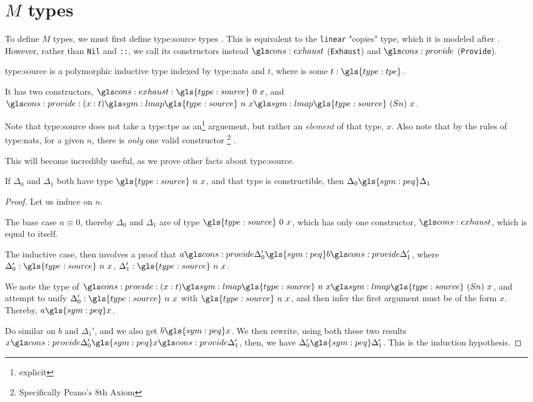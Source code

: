 \section{$M$ types}

To define $M$ types, we must first define \gls{type:source} types \cite{dep_mult_dep_lin}.
This is equivalent to the \verb|linear|  "copies" type, which it is modeled after \cite{inverse_of_type, idris_linear}. 
However, rather than \verb|Nil| and \verb|::|, we call its constructors instead $\mz$ (\verb|Exhaust|) and $\nsum$ (\verb|Provide|).

\begin{definition}
	\gls{type:source} is a polymorphic inductive type indexed by \gls{type:nats} and $t$, where is some $t : \gls{type:tpe}$.
	
	It has two constructors, $\mz : \gls{type:source} \ 0 \ x$, and $\nsum : (x : t) \proc \gls{type:source} \ n \ x \proc \gls{type:source} \ (S n) \ x$.
\end{definition}

Note that \gls{type:source} does not take a \gls{type:tpe} as an\footnote{explicit} arguement, but rather an \emph{element} of that type, $x$. 
Also note that by the rules of \gls{type:nats}, for a given $n$, there is \emph{only} one valid constructor \footnote{Specifically Peano's 8th Axiom} \needcite.

This will become incredibly useful, as we prove other facts about \gls{type:source}.

\begin{lemma}
	\label{lem:unique}
	If $\Delta_0$ and $\Delta_1$ both have type $\gls{type:source} \ n \ x$, and that type is constructible, then $\Delta_0 \gls{sym:peq} \Delta_1$
\end{lemma}

\begin{proof}
	Let us induce on $n$.
	
	The base case $n \equiv 0$, thereby $\Delta_0$ and $\Delta_1$ are of type $\gls{type:source} \ 0 \ x$, which has only one constructor, $\mz$, which is equal to itself.
	
	The inductive case, then involves a proof that $a \nsum \Delta_0' \gls{sym:peq} b \nsum \Delta_1'$, where $\Delta_0' : \gls{type:source} \ n \ x$, $\Delta_1' : \gls{type:source} \ n \ x$.
	
	We note the type of $\nsum : (x : t) \proc \gls{type:source} \ n \ x \proc \gls{type:source} \ (S n) \ x$, and attempt to unify $\Delta_0' : \gls{type:source} \ n \ x$ with $\gls{type:source} \ n \ x$, and then infer the first argument must be of the form $x$.
	Thereby, $a \gls{sym:peq} x$.
	
	Do similar on $b$ and $\Delta_1'$, and we also get $b \gls{sym:peq} x$. 
	We then rewrite, using both these two results $x \nsum \Delta_0' \gls{sym:peq} x \nsum \Delta_1'$, then, we have $\Delta_0' \gls{sym:peq} \Delta_1'$.
	This is the induction hypothesis.
\end{proof}

